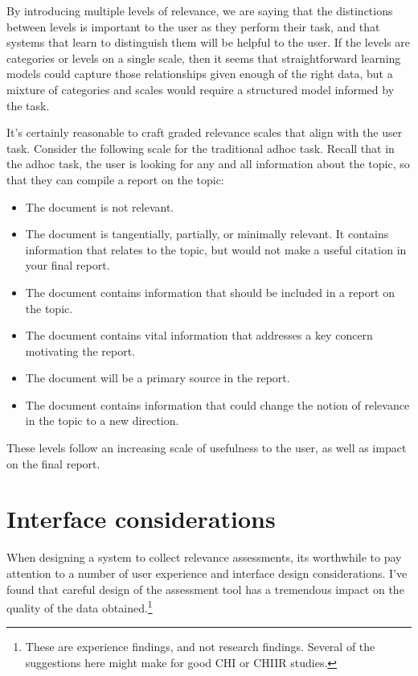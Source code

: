 \documentclass[nobib]{tufte-book}
\begin{document}
By introducing multiple levels of relevance, we are saying that the distinctions between levels is important to the user as they perform their task, and that systems that learn to distinguish them will be helpful to the user.  If the levels are categories or levels on a single scale, then it seems that straightforward learning models could capture those relationships given enough of the right data, but a mixture of categories and scales would require a structured model informed by the task.

It's certainly reasonable to craft graded relevance scales that align with the user task.  Consider the following scale for the traditional adhoc task.  Recall that in the adhoc task, the user is looking for any and all information about the topic, so that they can compile a report on the topic:

\begin{itemize}
\item The document is not relevant.
\item The document is tangentially, partially, or minimally relevant.  It contains information that relates to the topic, but would not make a useful citation in your final report.
\item The document contains information that should be included in a report on the topic.
\item The document contains vital information that addresses a key concern motivating the report.
\item The document will be a primary source in the report.
\item The document contains information that could change the notion of relevance in the topic to a new direction.
\end{itemize}

These levels follow an increasing scale of usefulness to the user, as well as impact on the final report.

\section{Interface considerations}

When designing a system to collect relevance assessments, its worthwhile to pay attention to a number of user experience and interface design considerations.  I've found that careful design of the assessment tool has a tremendous impact on the quality of the data obtained.\footnote{These are experience findings, and not research findings.  Several of the suggestions here might make for good CHI or CHIIR studies.}
\end{document}
